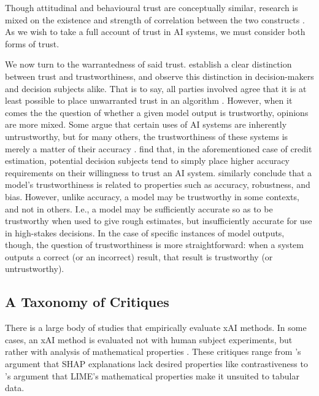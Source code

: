 Though attitudinal and behavioural trust are conceptually similar, research is mixed on the existence and strength of correlation between the two constructs \cite{ahmed_relationship_2009, kim_relation_2018}. As we wish to take a full account of trust in AI systems, we must consider both forms of trust.

We now turn to the warrantedness of said trust. \textcite{Vereschak_Alizadeh_Bailly_Caramiaux_2024} establish a clear distinction between trust and trustworthiness, and observe this distinction in decision-makers and decision subjects alike. That is to say, all parties involved agree that it is at least possible to place unwarranted trust in an algorithm \cite{Vereschak_Alizadeh_Bailly_Caramiaux_2024}. However, when it comes the the question of whether a given model output is trustworthy, opinions are more mixed. Some argue that certain uses of AI systems are inherently untrustworthy, but for many others, the trustworthiness of these systems is merely a matter of their accuracy \cite{Rebitschek_Gigerenzer_Wagner_2021}. \textcite{Rebitschek_Gigerenzer_Wagner_2021} find that, in the aforementioned case of credit estimation, potential decision subjects tend to simply place higher accuracy requirements on their willingness to trust an AI system. \textcite{jacovi_formalizing_2021} similarly conclude that a model's trustworthiness is related to properties such as accuracy, robustness, and bias. However, unlike accuracy, a model may be trustworthy in some contexts, and not in others. I.e., a model may be sufficiently accurate so as to be trustworthy when used to give rough estimates, but insufficiently accurate for use in high-stakes decisions. In the case of specific instances of model outputs, though, the question of trustworthiness is more straightforward: when a system outputs a correct (or an incorrect) result, that result is trustworthy (or untrustworthy).

\subsection{A Taxonomy of Critiques}
There is a large body of studies that empirically evaluate xAI methods. In some cases, an xAI method is evaluated not with human subject experiments, but rather with analysis of mathematical properties \cite{doshi-velez_towards_2017}. These critiques range from \textcite{kumar_problems_2020}'s argument that SHAP explanations lack desired properties like contrastiveness to \textcite{lundberg_unified_2017}'s argument that LIME's mathematical properties make it unsuited to tabular data.

